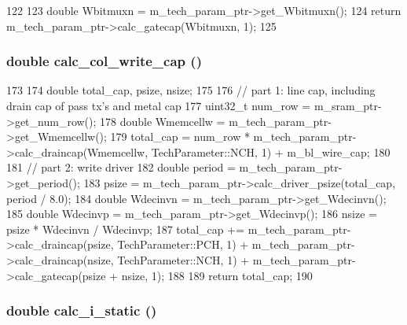 \begin{DoxyCode}
122 {
123     double Wbitmuxn = m_tech_param_ptr->get_Wbitmuxn();
124     return m_tech_param_ptr->calc_gatecap(Wbitmuxn, 1);
125 }
\end{DoxyCode}
\hypertarget{classBitlineUnit_a0d247ef9da513a39c1c01302379f940a}{
\subsubsection[{calc\_\-col\_\-write\_\-cap}]{\setlength{\rightskip}{0pt plus 5cm}double calc\_\-col\_\-write\_\-cap ()}}
\label{classBitlineUnit_a0d247ef9da513a39c1c01302379f940a}



\begin{DoxyCode}
173 {
174     double total_cap, psize, nsize;
175 
176     // part 1: line cap, including drain cap of pass tx's and metal cap
177     uint32_t num_row = m_sram_ptr->get_num_row();
178     double Wmemcellw = m_tech_param_ptr->get_Wmemcellw();
179     total_cap = num_row * m_tech_param_ptr->calc_draincap(Wmemcellw, 
      TechParameter::NCH, 1) + m_bl_wire_cap;
180 
181     // part 2: write driver
182     double period = m_tech_param_ptr->get_period();
183     psize = m_tech_param_ptr->calc_driver_psize(total_cap, period / 8.0);
184     double Wdecinvn = m_tech_param_ptr->get_Wdecinvn();
185     double Wdecinvp = m_tech_param_ptr->get_Wdecinvp();
186     nsize = psize * Wdecinvn / Wdecinvp;
187     total_cap += m_tech_param_ptr->calc_draincap(psize, TechParameter::PCH, 1) + 
      m_tech_param_ptr->calc_draincap(nsize, TechParameter::NCH, 1) + m_tech_param_ptr-
      >calc_gatecap(psize + nsize, 1);
188 
189     return total_cap;
190 }
\end{DoxyCode}
\hypertarget{classBitlineUnit_a0027807356ac4ca07fe2e593234eb884}{
\subsubsection[{calc\_\-i\_\-static}]{\setlength{\rightskip}{0pt plus 5cm}double calc\_\-i\_\-static ()}}
\label{classBitlineUnit_a0027807356ac4ca07fe2e593234eb884}



